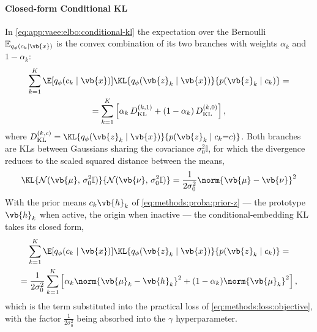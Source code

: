 \paragraph{Closed-form Conditional KL}
In \cref{eq:app:vaee:elbo:conditional-kl} the expectation over
the Bernoulli $\mathbb{E}_{q_\phi(c_k \mid \vb{x})}$ is the convex combination
of its two branches with weights $\alpha_k$ and $1 - \alpha_k$:
\begin{multline*}
    \sum_{k=1}^{K} \E[q_\phi(c_k \mid \vb{x})]{ \KL{q_\phi(\vb{z}_k \mid \vb{x})}{p(\vb{z}_k \mid c_k)}} =\\
    = \sum_{k=1}^{K} \left[ \alpha_k\, D_{\mathrm{KL}}^{(k,1)} + (1 - \alpha_k)\, D_{\mathrm{KL}}^{(k,0)}
    \right],
\end{multline*}
where $D_{\mathrm{KL}}^{(k,c)} = \KL{q_\phi(\vb{z}_k \mid \vb{x})}{p(\vb{z}_k \mid c_k {=} c)}$.
Both branches are \aclp{KL} between Gaussians sharing the covariance
$\sigma_0^2 \mathbb{I}$, for which the divergence reduces to the scaled squared
distance between the means,
\begin{equation*}
    \KL{\mathcal{N}(\vb{\mu}, \,\sigma_0^2 \mathbb{I})}{\mathcal{N}(\vb{\nu}, \,\sigma_0^2 \mathbb{I})}
    = \frac{1}{2 \sigma_0^2}{\norm{\vb{\mu} - \vb{\nu}}^2}
\end{equation*}
With the prior means $c_k \vb{h}_k$ of \cref{eq:methods:proba:prior-z}
--- the prototype $\vb{h}_k$ when active, the origin when inactive --- the
conditional-embedding \ac{KL} takes its closed form,
\begin{multline*}
    \sum_{k=1}^{K} \E[q_\phi(c_k \mid \vb{x})]{\KL{q_\phi(\vb{z}_k \mid \vb{x})}{p(\vb{z}_k \mid c_k)}} =\\
    = \frac{1}{2\sigma_0^2} \sum_{k=1}^{K} \left[ \alpha_k \norm{\vb{\mu}_k - \vb{h}_k}^2 + (1 - \alpha_k) \norm{\vb{\mu}_k}^2 \right],
\end{multline*}
which is the term substituted into the practical loss of
\cref{eq:methods:loss:objective}, with the factor
$\tfrac{1}{2 \sigma^{2}_{0}}$ being absorbed into the $\gamma$ hyperparameter.
